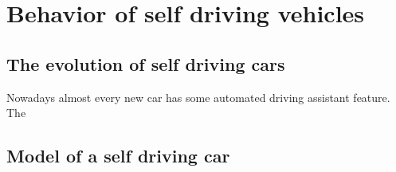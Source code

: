 \chapter{Behavior of self driving vehicles}
	\section{The evolution of self driving cars}
		Nowadays almost every new car has some automated driving assistant feature. The 
	\section{Model of a self driving car}
